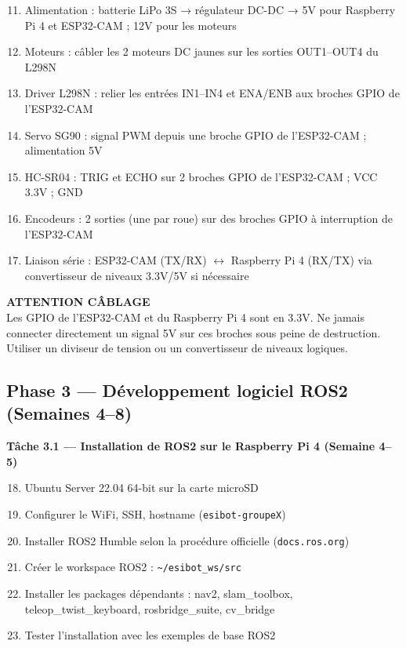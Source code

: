 \documentclass[12pt,a4paper]{article}
\begin{document}
\begin{enumerate}
  \setcounter{enumi}{10}
  \item Alimentation : batterie LiPo 3S → régulateur DC-DC → 5V pour Raspberry Pi 4 et ESP32-CAM ; 12V pour les moteurs
  \item Moteurs : câbler les 2 moteurs DC jaunes sur les sorties OUT1–OUT4 du L298N
  \item Driver L298N : relier les entrées IN1–IN4 et ENA/ENB aux broches GPIO de l'ESP32-CAM
  \item Servo SG90 : signal PWM depuis une broche GPIO de l'ESP32-CAM ; alimentation 5V
  \item HC-SR04 : TRIG et ECHO sur 2 broches GPIO de l'ESP32-CAM ; VCC 3.3V ; GND
  \item Encodeurs : 2 sorties (une par roue) sur des broches GPIO à interruption de l'ESP32-CAM
  \item Liaison série : ESP32-CAM (TX/RX) $\leftrightarrow$ Raspberry Pi 4 (RX/TX) via convertisseur de niveaux 3.3V/5V si nécessaire
\end{enumerate}

\begin{warningbox}
\textbf{ATTENTION CÂBLAGE}\\[4pt]
Les GPIO de l'ESP32-CAM et du Raspberry Pi 4 sont en 3.3V. Ne jamais connecter directement un signal 5V sur ces broches sous peine de destruction. Utiliser un diviseur de tension ou un convertisseur de niveaux logiques.
\end{warningbox}

\subsection*{Phase 3 — Développement logiciel ROS2 (Semaines 4–8)}

\textbf{Tâche 3.1 — Installation de ROS2 sur le Raspberry Pi 4 (Semaine 4–5)}

\begin{enumerate}
  \setcounter{enumi}{17}
  \item Ubuntu Server 22.04 64-bit sur la carte microSD
  \item Configurer le WiFi, SSH, hostname (\texttt{esibot-groupeX})
  \item Installer ROS2 Humble selon la procédure officielle (\texttt{docs.ros.org})
  \item Créer le workspace ROS2 : \texttt{\textasciitilde/esibot\_ws/src}
  \item Installer les packages dépendants : nav2, slam\_toolbox, teleop\_twist\_keyboard, rosbridge\_suite, cv\_bridge
  \item Tester l'installation avec les exemples de base ROS2
\end{enumerate}
\end{document}
